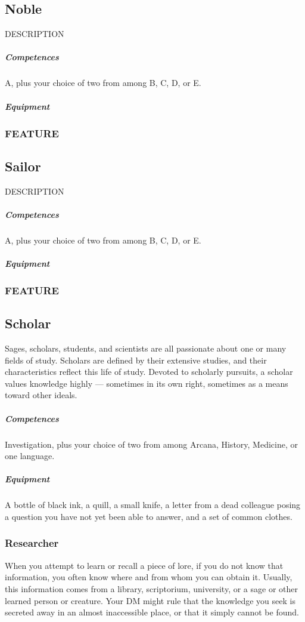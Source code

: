 \subsection*{Noble} \label{ssec::noble}
    DESCRIPTION
    \subparagraph{Competences} A, plus your choice of two from among B, C, D, or E.
    \subparagraph{Equipment}
    \subsubsection{FEATURE}

\subsection*{Sailor} \label{ssec::sailor}
    DESCRIPTION
    \subparagraph{Competences} A, plus your choice of two from among B, C, D, or E.
    \subparagraph{Equipment}
    \subsubsection{FEATURE}

\subsection*{Scholar} \label{ssec::scholar}
    Sages, scholars, students, and scientists are all passionate about one or many fields of study.
    Scholars are defined by their extensive studies, and their characteristics reflect this life of study.
    Devoted to scholarly pursuits, a scholar values knowledge highly --- sometimes in its own right, sometimes as a means toward other ideals.
    \subparagraph{Competences} Investigation, plus your choice of two from among Arcana, History, Medicine, or one language.
    \subparagraph{Equipment} A bottle of black ink, a quill, a small knife, a letter from a dead colleague posing a question you have not yet been able to answer, and a set of common clothes.
    \subsubsection{Researcher} \label{feat::researcher}
        When you attempt to learn or recall a piece of lore, if you do not know that information, you often know where and from whom you can obtain it.
        Usually, this information comes from a library, scriptorium, university, or a sage or other learned person or creature.
        Your DM might rule that the knowledge you seek is secreted away in an almost inaccessible place, or that it simply cannot be found.

